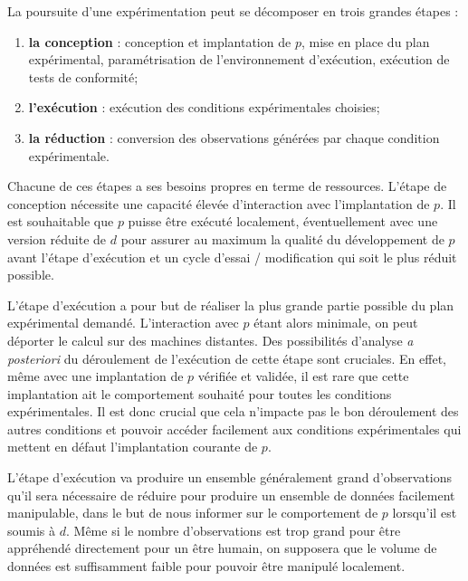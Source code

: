 La poursuite d'une expérimentation peut se décomposer en trois grandes étapes :
\begin{enumerate}
  \item \textbf{la conception} : conception et implantation de $p$, mise en place du plan expérimental, paramétrisation de l'environnement d'exécution, exécution de tests de conformité;
  \item \textbf{l'exécution} : exécution des conditions expérimentales choisies;
  \item \textbf{la réduction} : conversion des observations générées par chaque condition expérimentale.
\end{enumerate}

Chacune de ces étapes a ses besoins propres en terme de ressources. L'étape de conception nécessite une capacité élevée d'interaction avec l'implantation de $p$. Il est souhaitable que $p$ puisse être exécuté localement, éventuellement avec une version réduite de $d$ pour assurer au maximum la qualité du développement de $p$ avant l'étape d'exécution et un cycle d'essai / modification qui soit le plus réduit possible.

L'étape d'exécution a pour but de réaliser la plus grande partie possible du plan expérimental demandé. L'interaction avec $p$ étant alors minimale, on peut déporter le calcul sur des machines distantes. Des possibilités d'analyse \textit{a posteriori} du déroulement de l'exécution de cette étape sont cruciales. En effet, même avec une implantation de $p$ vérifiée et validée, il est rare que cette implantation ait le comportement souhaité pour toutes les conditions expérimentales. Il est donc crucial que cela n'impacte pas le bon déroulement des autres conditions et pouvoir accéder facilement aux conditions expérimentales qui mettent en défaut l'implantation courante de $p$.

L'étape d'exécution va produire un ensemble généralement grand d'observations qu'il sera nécessaire de réduire pour produire un ensemble de données facilement manipulable, dans le but de nous informer sur le comportement de $p$ lorsqu'il est soumis à $d$. Même si le nombre d'observations est trop grand pour être appréhendé directement pour un être humain, on supposera que le volume de données est suffisamment faible pour pouvoir être manipulé localement.


